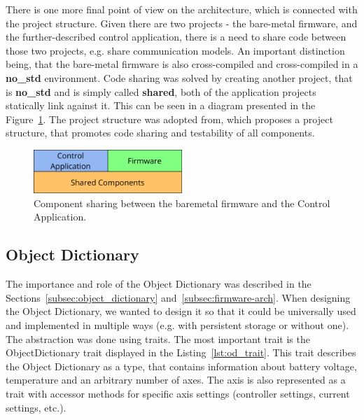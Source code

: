 There is one more final point of view on the architecture, which is connected with the project structure.
Given there are two projects - the bare-metal firmware, and the further-described control application, there is a need to share code between those two projects, e.g. share communication models.
An important distinction being, that the bare-metal firmware is also cross-compiled and cross-compiled in a \textbf{no\_std} environment.
Code sharing was solved by creating another project, that is \textbf{no\_std} and is simply called \textbf{shared}, both of the application projects statically link against it.
This can be seen in a diagram presented in the Figure~\ref{fig:component_arch}.
The project structure was adopted from\cite{aparicio_testing_nodate}, which proposes a project structure, that promotes code sharing and testability of all components.

\begin{figure}[H]
    \centering
    \includegraphics[width=0.5\textwidth]{obrazky/components}
    \caption{Component sharing between the bare\textendash metal firmware and the Control Application.}
    \label{fig:component_arch}
\end{figure}

\subsection{Object Dictionary}
\label{subsec:object_dict_impl}
The importance and role of the Object Dictionary was described in the Sections~\ref{subsec:object_dictionary} and~\ref{subsec:firmware-arch}.
When designing the Object Dictionary, we wanted to design it so that it could be universally used and implemented in multiple ways (e.g. with persistent storage or without one).
The abstraction was done using traits.
The most important trait is the ObjectDictionary trait displayed in the Listing~\ref{lst:od_trait}.
This trait describes the Object Dictionary as a type, that contains information about battery voltage, temperature and an arbitrary number of axes.
The axis is also represented as a trait with accessor methods for specific axis settings (controller settings, current settings, etc.).

